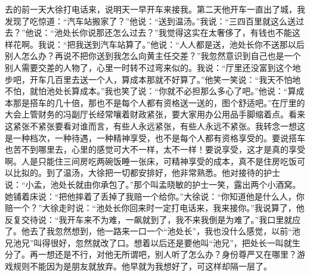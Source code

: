 \documentclass[12pt,oneside]{book}
\begin{document}
去的前一天大徐打电话来，说明天一早开车来接我。第二天他开车一直出了城，我发现了吃惊道：``汽车站搬家了？''他说：``送到温汤。''我说：``三四百里就这么送过去？''他说：``池处长你说那还怎么过去？''我觉得这实在太奢侈了，有钱也不能这样花啊。我说：``把我送到汽车站算了。''他说：``人人都是送，池处长你不送那以后别人怎么办？再说不把你送到我怎么向黄主任交差？''我忽然意识到自己也是一个别人需要交差的人物了，心里一时转不过弯来似的。我说：``厅里还没富到这个地步吧，开车几百里去送一个人，算成本那就不好算了。''他笑一笑说：``我天不怕地不怕，就怕池处长算成本。''我也笑了说：``你就不必担那么多心了吧。''他说：``算成本那是搭车的几十倍，那也不是每个人都有资格送一送的，图个舒适吧。''在厅里的大会上管财务的冯副厅长经常嚷着财政紧张，要大家用办公用品手脚缩着点。看来这紧张不紧张要看对谁而言，有些人永远紧张，有些人永远不紧张。我转念一想这是一种档次，一种待遇，一种精神享受，也不是每个人都有资格享受的。要说搭车也苦不到哪里去，心里的感觉可大不一样，太不一样！要说享受，这才是真的享受啊。人是只能住三间房吃两碗饭睡一张床，可精神享受的成本，真不是住房吃饭可以比拟的。到了温汤，大徐把一切都安排好，他非常熟悉。他对接待的护士说：``小孟，池处长就由你承包了。''那个叫孟晓敏的护士一笑，露出两个小酒窝。她铺着床说：``把他摔着了丢掉了我赔一个给你。''大徐说：``你知道他是什么人，你赔一个？''大徐走时说：``池处长你回来时一定打电话来，我来接你。''我说算了，他反复交待说：``我开车来不为难，一飙就到了，我不来我倒是为难了。''我口里就应了。他去了我忽然想到，他一路来一口一个``池处长''，我也没什么感觉，以前``池兄池兄''叫得很好，忽然就改了口。想着以后还是要他叫``池兄''，把处长一叫就生分了。再一想还是不行，对他无所谓吧，别人听了怎么办？身份尊严又在哪里？游戏规则不能因为是朋友就放弃。他早就为我想好了，可这样却隔一层了。
\end{document}
